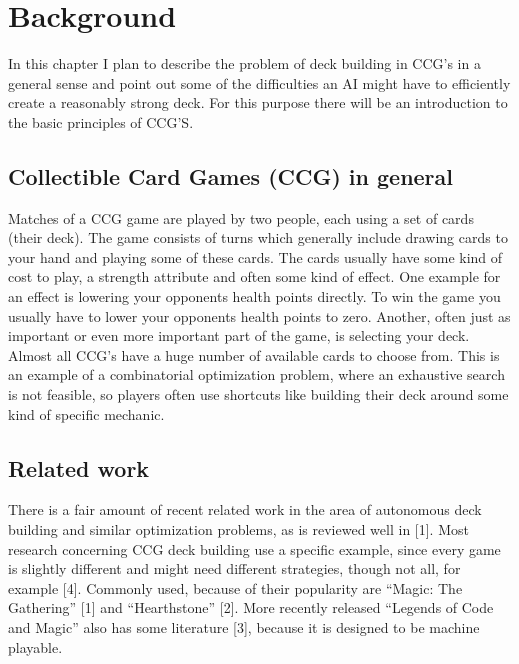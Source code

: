 \chapter{Background}
\label{ch:background}
In this chapter I plan to describe the problem of deck building in CCG’s in a general sense and point out some of the difficulties an AI might have to efficiently create a reasonably strong deck. For this purpose there will be an introduction to the basic principles of CCG’S.

\section{Collectible Card Games (CCG) in general}
\label{sec:background:ccg}
Matches of a CCG game are played by two people, each using a set of cards (their deck). The game consists of turns which generally include drawing cards to your hand and playing some of these cards. The cards usually have some kind of cost to play, a strength attribute and often some kind of effect. One example for an effect is lowering your opponents health points directly. To win the game you usually have to lower your opponents health points to zero. 
Another, often just as important or even more important part of the game, is selecting your deck. Almost all CCG’s have a huge number of available cards to choose from. This is an example of a combinatorial optimization problem, where an exhaustive search is not feasible, so players often use shortcuts like building their deck around some kind of specific mechanic.

\section{Related work}
\label{sec:background:related}
There is a fair amount of recent related work in the area of autonomous deck building and similar optimization problems, as is reviewed well in [1]. Most research concerning CCG deck building use a specific example, since every game is slightly different and might need different strategies, though not all, for example [4]. Commonly used, because of their popularity are “Magic: The Gathering” [1] and “Hearthstone” [2]. More recently released “Legends of Code and Magic” also has some literature [3], because it is designed to be machine playable.

